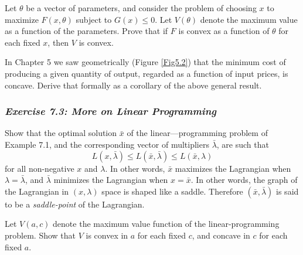 Let $\theta$ be a vector of parameters, and consider the problem of choosing $x$ to maximize $F(x,\theta)$ subject to $G(x) \leq 0$. Let $V(\theta)$ denote the maximum value as a function of the parameters. Prove that if $F$ is convex as a function of $\theta$ for each fixed $x$, then $V$ is convex.

In Chapter 5 we saw geometrically (Figure \ref{Fig5.2}) that the minimum cost of producing a given quantity of output, regarded as a function of input prices, is concave. Derive that formally as a corollary of the above general result.

\subsubsection*{\textit{Exercise 7.3: More on Linear Programming}}

Show that the optimal solution $\bar{x}$ of the linear—programming problem of Example 7.1, and the corresponding vector of multipliers $\bar{\lambda}$, are such that
\begin{equation*}
L(x, \bar{\lambda}) \leq L(\bar{x}, \bar{\lambda}) \leq L(\bar{x}, \lambda)
\end{equation*}
for all non-negative $x$ and $\lambda$. In other words, $\bar{x}$ maximizes the Lagrangian when $\lambda = \bar{\lambda}$, and $\bar{\lambda}$ minimizes the Lagrangian when $x = \bar{x}$. In other words, the graph of the Lagrangian in $(x, \lambda)$ space is shaped like a saddle. Therefore $(\bar{x}, \bar{\lambda})$ is said to be a \textit{saddle-point} of the Lagrangian.

Let $V(a, c)$ denote the maximum value function of the linear-programming problem. Show that $V$ is convex in $a$ for each fixed $c$, and concave in $c$ for each fixed $a$.




